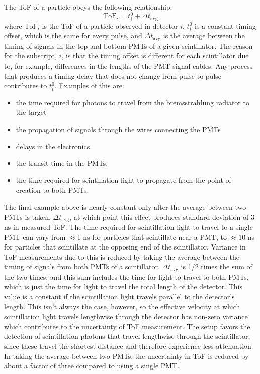 The ToF of a particle obeys the following relationship:
\begin{displaymath}
\text{ToF}_i = t_{i}^0 + \Delta t_{\text{avg}}
\end{displaymath}
where $\text{ToF}_i$ is the ToF of a particle observed in detector $i$, $t_{i}^0$ is a constant timing offset, which is the same for every pulse, and $\Delta t_{\text{avg}} $ is the average between the timing of signals in the top and bottom PMTs of a given scintillator.
The reason for the subscript, $i$, is that the timing offset is different for each scintillator due to, for example, differences in the lengths of the PMT signal cables.
Any process that produces a timing delay that does not change from pulse to pulse contributes to $ t_{i}^0$.
Examples of this are:
\begin{itemize}
\item the time required for photons to travel from the bremsstrahlung radiator to the target
\item the propagation of signals through the wires connecting the PMTs
\item delays in the electronics
\item the transit time in the PMTs.
\item the time required for scintillation light to propagate from the point of creation to both PMTs.
\end{itemize}
The final example above is nearly constant only after the average between two PMTs is taken, $\Delta t_{\text{avg}}$, at which point this effect produces standard deviation of 3 ns in measured ToF.
The time required for scintillation light to travel to a single PMT can vary from $\approx$1 ns for particles that scintillate near a PMT, to $\approx$10 ns for particles that scintillate at the opposing end of the scintillator.
Variance in ToF measurements due to this is reduced by taking the average between the timing of signals from both PMTs of a scintillator.
$\Delta t_{\text{avg}}$ is 1/2 times the sum of the two times, and this sum includes the time for light to travel to both PMTs, which is just the time for light to travel the total length of the detector.
This value is a constant if the scintillation light travels parallel to the detector's length.
This isn't always the case, however, so the effective velocity at which scintillation light travels lengthwise through the detector has non-zero variance which contributes to the uncertainty of ToF measurement.
The setup favors the detection of scintillation photons that travel lengthwise through the scintillator, since these travel the shortest distance and therefore experience less attenuation.
In taking the average between two PMTs, the uncertainty in ToF is reduced by about a factor of three compared to using a single PMT.

